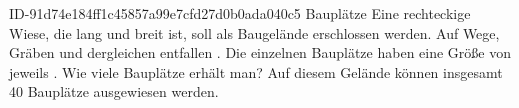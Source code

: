 \begin{exercise}
      {ID-91d74e184ff1c45857a99e7cfd27d0b0ada040c5}
      {Bauplätze}
  \ifproblem\problem
    Eine rechteckige Wiese, die  lang und  breit ist, soll
    als Baugelände erschlossen werden. Auf Wege, Gräben und dergleichen entfallen
    . Die einzelnen Bauplätze haben eine Größe von jeweils .
    Wie viele Bauplätze erhält man?
  \fi
  \ifoutcome\outcome
    Auf diesem Gelände können insgesamt \num{40} Bauplätze ausgewiesen werden.
  \fi
\end{exercise}
